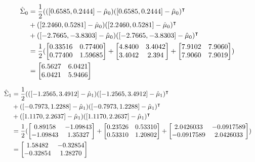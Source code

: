\documentclass{jhwhw}
\begin{document}
    \begin{align*}
	\Hat{\Sigma}_0 &= \frac{1}{2}(
	    ([0.6585, 0.2444] - \Hat{\mu}_0)([0.6585, 0.2444] - \Hat{\mu}_0)^\intercal &\\
	    &+ ([2.2460, 0.5281] - \Hat{\mu}_0)([2.2460, 0.5281] - \Hat{\mu}_0)^\intercal &\\
	    &+ ([-2.7665, -3.8303] - \Hat{\mu}_0)([-2.7665, -3.8303] - \Hat{\mu}_0)^\intercal &\\
	    &= 
		\frac{1}{2} (
		    \begin{bmatrix}
			0.33516 & 0.77400 \\
			0.77400 & 1.59685 \\
		    \end{bmatrix}
		    +
		    \begin{bmatrix}
			4.8400 & 3.4042 \\
			3.4042 & 2.394
		    \end{bmatrix}
		    +
		    \begin{bmatrix}
			7.9102 & 7.9060 \\
			7.9060 & 7.9019 \\
		    \end{bmatrix}
		) &\\
	    &=
		\begin{bmatrix}
		    6.5627 & 6.0421 \\
		    6.0421 & 5.9466
		\end{bmatrix}
    \end{align*}

    \begin{align*}
	\Hat{\Sigma}_1 &= \frac{1}{2}(
	    ([-1.2565, 3.4912] - \Hat{\mu}_1)([-1.2565, 3.4912] - \Hat{\mu}_1)^\intercal &\\
	    &+ ([-0.7973, 1.2288] - \Hat{\mu}_1)([-0.7973, 1.2288] - \Hat{\mu}_1)^\intercal &\\
	    &+ ([1.1170, 2.2637] - \Hat{\mu}_1)([1.1170, 2.2637] - \Hat{\mu}_1)^\intercal &\\
	    &= 
		\frac{1}{2} (
		    \begin{bmatrix}
			0.89158 & -1.09843 \\
			-1.09843 & 1.35327
		    \end{bmatrix}
		    +
		    \begin{bmatrix}
			0.23526 & 0.53310 \\
			0.53310 & 1.20802 
		    \end{bmatrix}
		    +
		    \begin{bmatrix}
			2.0426033 & -0.0917589 \\
			-0.0917589 & 2.0426033
		    \end{bmatrix}
		) &\\
	    &=
		\begin{bmatrix}
		    1.58482 & -0.32854 \\
		    -0.32854 & 1.28270 
		\end{bmatrix}
    \end{align*}
\end{document}
